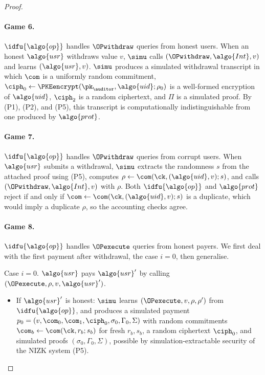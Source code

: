 \begin{proof}
\paragraph{Game 6.} $\idfu{\algo{op}}$ handles $\OPwithdraw$ queries from honest
users.  When an honest $\algo{usr}$ withdraws value $v$, $\simu$ calls
$(\OPwithdraw, \algo{Int}, v)$ and learns $(\algo{usr}, v)$. $\simu$
produces a simulated withdrawal transcript in which $\com$ is a uniformly
random commitment, $\ciph_0 \leftarrow \PKEencrypt(\pk_{\auditor}, \algo{uid};
\rho_0)$ is a well-formed encryption of $\algo{uid}$, $\ciph_2$ is a random
ciphertext, and $\Pi$ is a simulated proof.  By (P1), (P2), and (P5), this
transcript is computationally indistinguishable from one produced by
$\algo{prot}$.

\paragraph{Game 7.} $\idfu{\algo{op}}$ handles $\OPwithdraw$ queries from corrupt
users.  When $\algo{usr}$ submits a withdrawal, $\simu$ extracts the randomness
$s$ from the attached proof using (P5), computes $\rho \leftarrow \com(\ck,
(\algo{uid}, v); s)$, and calls $(\OPwithdraw, \algo{Int}, v)$ with $\rho$.
Both $\idfu{\algo{op}}$ and $\algo{prot}$ reject if and only if $\com \leftarrow
\com(\ck, (\algo{uid}, v); s)$ is a duplicate, which would imply a duplicate
$\rho$, so the accounting checks agree.

\paragraph{Game 8.} $\idfu{\algo{op}}$ handles $\OPexecute$ queries from honest payers.
We first deal with the first payment after withdrawal, the case $i = 0$, then
generalise.

Case $i = 0$. $\algo{usr}$ pays $\algo{usr}'$ by calling $(\OPexecute, \rho, v,
\algo{usr}')$.

\begin{itemize}

  \item If $\algo{usr}'$ is honest: $\simu$ learns $(\OPexecute, v, \rho,
    \rho')$ from $\idfu{\algo{op}}$, and produces a simulated payment $p_0 = (v, \com_0,
    \com_1, \ciph_0, \sigma_0, \Gamma_0, \Sigma)$ with random commitments
    $\com_b \leftarrow \com(\ck, r_b; s_b)$ for fresh $r_b, s_b$, a random
    ciphertext $\ciph_0$, and simulated proofs $(\sigma_0, \Gamma_0, \Sigma)$,
    possible by simulation-extractable security of the NIZK system (P5).


\end{itemize}
\end{proof}
